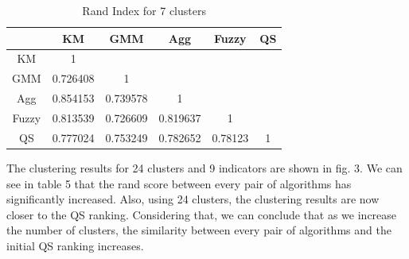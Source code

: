 \documentclass[conference]{IEEEtran}
\begin{document}
\begin{table}[ht]
    \begin{center}
        \caption{Rand Index for 7 clusters}
        \renewcommand{\arraystretch}{1.25}
        \begin{tabular}{ |c|c|c|c|c|c| } 
            \hline
            & KM & GMM & Agg & Fuzzy & QS \\
            \hline
            KM & 1 &  &  &  &  \\
            \hline
            GMM & 0.726408 & 1 &  &  & \\ 
            \hline
            Agg & 0.854153 & 0.739578 & 1 &  & \\ 
            \hline
            Fuzzy & 0.813539 & 0.726609 & 0.819637 & 1 & \\
            \hline
            QS & 0.777024 & 0.753249 & 0.782652 & 0.78123 & 1 \\
            \hline
        \end{tabular}
    \end{center}
\end{table}

The clustering results for 24 clusters and 9 indicators are shown in fig. 3. We can see in table 5 that the rand score between every pair of algorithms has significantly increased. Also, using 24 clusters, the clustering results are now closer to the QS ranking. Considering that, we can conclude that as we increase the number of clusters, the similarity between every pair of algorithms and the initial QS ranking increases. \\
\end{document}

